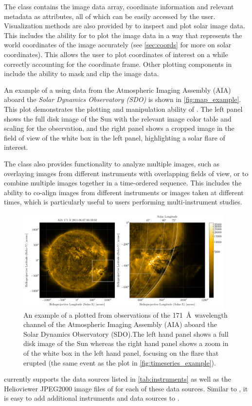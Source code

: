 The \Map class contains the image data array, coordinate information and relevant metadata as attributes, all of which can be easily accessed by the user. 
Visualization methods are also provided by \Map to inspect and plot solar image data. 
This includes the ability for \Map to plot the image data in a way that represents the world coordinates of the image accurately (see \autoref{sec:coords} for more on solar coordinates).
This allows the user to plot coordinates of interest on a \Map while correctly accounting for the coordinate frame. 
Other plotting components in \Map include the ability to mask and clip the image data. 

An example of a \Map using data from the Atmospheric Imaging Assembly (AIA) aboard the \textit{Solar Dynamics Observatory (SDO)} is shown in \autoref{fig:map_example}. 
This plot demonstrates the plotting and manipulation ability of \Map.
The left panel shows the full disk image of the Sun with the relevant image color table and scaling for the observation, and the right panel shows a cropped image in the field of view of the white box in the left panel, highlighting a solar flare of interest.

The \Map class also provides functionality to analyze multiple images, such as overlaying images from different instruments with overlapping fields of view, or to combine multiple images together in a time-ordered sequence.  
This includes the ability to co-align images from different instruments or images taken at different times, which is particularly useful to users performing multi-instrument studies. 


\begin{figure}
    \centering
    \includegraphics[width=0.97\textwidth]{figures/map_example.pdf}
    \caption{An example of a \sunpypkg \Map plotted from observations of the 171~\AA\ wavelength channel of the Atmospheric Imaging Assembly (AIA) aboard the Solar Dynamics Observatory (SDO).The left hand panel shows a full disk image of the Sun whereas the right hand panel shows a zoom in of the white box in the left hand panel, focusing on the flare that erupted (the same event as the \Timeseries plot in \autoref{fig:timeseries_example}).}
    \label{fig:map_example}
\end{figure}

\Map currently supports the data sources listed in \autoref{tab:instruments} as well as the Helioviewer JPEG2000 image files of for each of these data sources. Similar to \Timeseries, it is easy to add additional instruments and data sources to \Map. 
